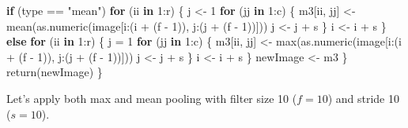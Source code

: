 \documentclass[
  12pt,
]{krantz}
\makeatletter
\newenvironment{Shaded}{\begin{snugshade}}{\end{snugshade}}
\newcommand{\ControlFlowTok}[1]{\textcolor[rgb]{0.27,0.27,0.27}{\textbf{#1}}}
\newcommand{\DecValTok}[1]{\textcolor[rgb]{0.06,0.06,0.06}{#1}}
\newcommand{\FunctionTok}[1]{\textcolor[rgb]{0,0,0}{#1}}
\newcommand{\NormalTok}[1]{#1}
\newcommand{\OtherTok}[1]{\textcolor[rgb]{0.37,0.37,0.37}{#1}}
\newcommand{\SpecialCharTok}[1]{\textcolor[rgb]{0,0,0}{#1}}
\newcommand{\StringTok}[1]{\textcolor[rgb]{0.5,0.5,0.5}{#1}}
\newenvironment{kframe}{%
\medskip{}
\setlength{\fboxsep}{.8em}
 \def\at@end@of@kframe{}%
 \ifinner\ifhmode%
  \def\at@end@of@kframe{\end{minipage}}%
  \begin{minipage}{\columnwidth}%
 \fi\fi%
 \def\FrameCommand##1{\hskip\@totalleftmargin \hskip-\fboxsep
 \colorbox{shadecolor}{##1}\hskip-\fboxsep
     \hskip-\linewidth \hskip-\@totalleftmargin \hskip\columnwidth}%
 \MakeFramed {\advance\hsize-\width
   \@totalleftmargin\z@ \linewidth\hsize
   \@setminipage}}%
 {\par\unskip\endMakeFramed%
 \at@end@of@kframe}
\renewenvironment{Shaded}{\begin{kframe}}{\end{kframe}}
\makeatother
\begin{document}
\begin{Shaded}
\begin{Highlighting}[]
        \ControlFlowTok{if}\NormalTok{ (type }\SpecialCharTok{==} \StringTok{"mean"}\NormalTok{) }
            \ControlFlowTok{for}\NormalTok{ (ii }\ControlFlowTok{in} \DecValTok{1}\SpecialCharTok{:}\NormalTok{r) \{}
\NormalTok{                j }\OtherTok{\textless{}{-}} \DecValTok{1}
                \ControlFlowTok{for}\NormalTok{ (jj }\ControlFlowTok{in} \DecValTok{1}\SpecialCharTok{:}\NormalTok{c) \{}
\NormalTok{                  m3[ii, jj] }\OtherTok{\textless{}{-}} \FunctionTok{mean}\NormalTok{(}\FunctionTok{as.numeric}\NormalTok{(image[i}\SpecialCharTok{:}\NormalTok{(i }\SpecialCharTok{+} 
\NormalTok{                    (f }\SpecialCharTok{{-}} \DecValTok{1}\NormalTok{)), j}\SpecialCharTok{:}\NormalTok{(j }\SpecialCharTok{+}\NormalTok{ (f }\SpecialCharTok{{-}} \DecValTok{1}\NormalTok{))]))}
\NormalTok{                  j }\OtherTok{\textless{}{-}}\NormalTok{ j }\SpecialCharTok{+}\NormalTok{ s}
\NormalTok{                \}}
\NormalTok{                i }\OtherTok{\textless{}{-}}\NormalTok{ i }\SpecialCharTok{+}\NormalTok{ s}
\NormalTok{            \} }\ControlFlowTok{else} \ControlFlowTok{for}\NormalTok{ (ii }\ControlFlowTok{in} \DecValTok{1}\SpecialCharTok{:}\NormalTok{r) \{}
\NormalTok{            j }\OtherTok{=} \DecValTok{1}
            \ControlFlowTok{for}\NormalTok{ (jj }\ControlFlowTok{in} \DecValTok{1}\SpecialCharTok{:}\NormalTok{c) \{}
\NormalTok{                m3[ii, jj] }\OtherTok{\textless{}{-}} \FunctionTok{max}\NormalTok{(}\FunctionTok{as.numeric}\NormalTok{(image[i}\SpecialCharTok{:}\NormalTok{(i }\SpecialCharTok{+} 
\NormalTok{                  (f }\SpecialCharTok{{-}} \DecValTok{1}\NormalTok{)), j}\SpecialCharTok{:}\NormalTok{(j }\SpecialCharTok{+}\NormalTok{ (f }\SpecialCharTok{{-}} \DecValTok{1}\NormalTok{))]))}
\NormalTok{                j }\OtherTok{\textless{}{-}}\NormalTok{ j }\SpecialCharTok{+}\NormalTok{ s}
\NormalTok{            \}}
\NormalTok{            i }\OtherTok{\textless{}{-}}\NormalTok{ i }\SpecialCharTok{+}\NormalTok{ s}
\NormalTok{        \}}
\NormalTok{        newImage }\OtherTok{\textless{}{-}}\NormalTok{ m3}
\NormalTok{    \}}
    \FunctionTok{return}\NormalTok{(newImage)}
\NormalTok{\}}
\end{Highlighting}
\end{Shaded}

Let's apply both max and mean pooling with filter size 10 (\(f = 10\)) and stride 10 (\(s = 10\)).
\end{document}

